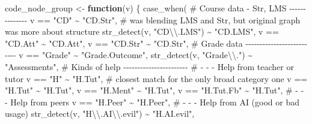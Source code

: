 \documentclass[
  letterpaper,
  DIV=11,
  numbers=noendperiod]{scrartcl}
\newenvironment{Shaded}{\begin{snugshade}}{\end{snugshade}}
\newcommand{\CommentTok}[1]{\textcolor[rgb]{0.37,0.37,0.37}{#1}}
\newcommand{\ControlFlowTok}[1]{\textcolor[rgb]{0.00,0.23,0.31}{\textbf{#1}}}
\newcommand{\FunctionTok}[1]{\textcolor[rgb]{0.28,0.35,0.67}{#1}}
\newcommand{\NormalTok}[1]{\textcolor[rgb]{0.00,0.23,0.31}{#1}}
\newcommand{\OtherTok}[1]{\textcolor[rgb]{0.00,0.23,0.31}{#1}}
\newcommand{\SpecialCharTok}[1]{\textcolor[rgb]{0.37,0.37,0.37}{#1}}
\newcommand{\StringTok}[1]{\textcolor[rgb]{0.13,0.47,0.30}{#1}}
\begin{document}
\begin{Shaded}
\begin{Highlighting}[]
\NormalTok{code\_node\_group }\OtherTok{\textless{}{-}} \ControlFlowTok{function}\NormalTok{(v) \{}
    \FunctionTok{case\_when}\NormalTok{(}
        \CommentTok{\# Course data {-} Str, LMS {-}{-}{-}{-}{-}{-}{-}{-}{-}{-}{-}{-}{-}{-}}
\NormalTok{        v }\SpecialCharTok{==} \StringTok{"CD"} \SpecialCharTok{\textasciitilde{}} \StringTok{"CD.Str"}\NormalTok{, }\CommentTok{\# was blending LMS and Str, but original graph was more about structure}
        \FunctionTok{str\_detect}\NormalTok{(v, }\StringTok{"CD}\SpecialCharTok{\textbackslash{}\textbackslash{}}\StringTok{.LMS"}\NormalTok{) }\SpecialCharTok{\textasciitilde{}} \StringTok{"CD.LMS"}\NormalTok{,}
\NormalTok{        v }\SpecialCharTok{==} \StringTok{"CD.Att"} \SpecialCharTok{\textasciitilde{}} \StringTok{"CD.Att"}\NormalTok{,}
\NormalTok{        v }\SpecialCharTok{==} \StringTok{"CD.Str"} \SpecialCharTok{\textasciitilde{}} \StringTok{"CD.Str"}\NormalTok{,}
        \CommentTok{\# Grade data {-}{-}{-}{-}{-}{-}{-}{-}{-}{-}{-}{-}{-}{-}{-}{-}{-}{-}{-}{-}{-}{-}{-}{-}{-}{-}}
\NormalTok{        v }\SpecialCharTok{==} \StringTok{"Grade"} \SpecialCharTok{\textasciitilde{}} \StringTok{"Grade.Outcome"}\NormalTok{,}
        \FunctionTok{str\_detect}\NormalTok{(v, }\StringTok{"Grade}\SpecialCharTok{\textbackslash{}\textbackslash{}}\StringTok{."}\NormalTok{) }\SpecialCharTok{\textasciitilde{}} \StringTok{"Assessments"}\NormalTok{,}
        \CommentTok{\# Kinds of help {-}{-}{-}{-}{-}{-}{-}{-}{-}{-}{-}{-}{-}{-}{-}{-}{-}{-}{-}{-}{-}{-}{-}}
        \CommentTok{\# {-} {-} {-} Help from teacher or tutor}
\NormalTok{        v }\SpecialCharTok{==} \StringTok{"H"} \SpecialCharTok{\textasciitilde{}} \StringTok{"H.Tut"}\NormalTok{, }\CommentTok{\# closest match for the only broad category one}
\NormalTok{        v }\SpecialCharTok{==} \StringTok{"H.Tut"} \SpecialCharTok{\textasciitilde{}} \StringTok{"H.Tut"}\NormalTok{,}
\NormalTok{        v }\SpecialCharTok{==} \StringTok{"H.Ment"} \SpecialCharTok{\textasciitilde{}} \StringTok{"H.Tut"}\NormalTok{,}
\NormalTok{        v }\SpecialCharTok{==} \StringTok{"H.Tut.Fb"} \SpecialCharTok{\textasciitilde{}} \StringTok{"H.Tut"}\NormalTok{,}
        \CommentTok{\# {-} {-} {-} Help from peers}
\NormalTok{        v }\SpecialCharTok{==} \StringTok{"H.Peer"} \SpecialCharTok{\textasciitilde{}} \StringTok{"H.Peer"}\NormalTok{,}
        \CommentTok{\# {-} {-} {-} Help from AI (good or bad usage)}
        \FunctionTok{str\_detect}\NormalTok{(v, }\StringTok{"H}\SpecialCharTok{\textbackslash{}\textbackslash{}}\StringTok{.AI}\SpecialCharTok{\textbackslash{}\textbackslash{}}\StringTok{.evil"}\NormalTok{) }\SpecialCharTok{\textasciitilde{}} \StringTok{"H.AI.evil"}\NormalTok{,}

\end{Highlighting}
\end{Shaded}
\end{document}
